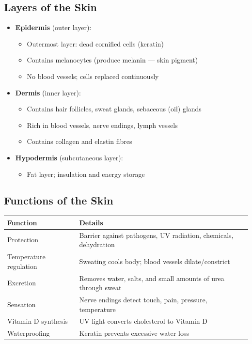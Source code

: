\documentclass[12pt]{article}
\newcommand{\hcell}[1]{\textbf{\color{white}#1}}
\begin{document}
\subsection{Layers of the Skin}
\begin{itemize}[leftmargin=16pt, itemsep=4pt]
  \item \textbf{Epidermis} (outer layer):
    \begin{itemize}[leftmargin=12pt]
      \item Outermost layer: dead cornified cells (keratin)
      \item Contains melanocytes (produce melanin — skin pigment)
      \item No blood vessels; cells replaced continuously
    \end{itemize}
  \item \textbf{Dermis} (inner layer):
    \begin{itemize}[leftmargin=12pt]
      \item Contains hair follicles, sweat glands, sebaceous (oil) glands
      \item Rich in blood vessels, nerve endings, lymph vessels
      \item Contains collagen and elastin fibres
    \end{itemize}
  \item \textbf{Hypodermis} (subcutaneous layer):
    \begin{itemize}[leftmargin=12pt]
      \item Fat layer; insulation and energy storage
    \end{itemize}
\end{itemize}

\subsection{Functions of the Skin}
\begin{center}
\renewcommand{\arraystretch}{1.4}
\begin{tabular}{|C{4cm}|C{8.5cm}|}
\hline
{}\hcell{Function} & \hcell{Details} \\
\hline
Protection & Barrier against pathogens, UV radiation, chemicals, dehydration \\
 Temperature regulation & Sweating cools body; blood vessels dilate/constrict \\
Excretion & Removes water, salts, and small amounts of urea through sweat \\
 Sensation & Nerve endings detect touch, pain, pressure, temperature \\
Vitamin D synthesis & UV light converts cholesterol to Vitamin D \\
 Waterproofing & Keratin prevents excessive water loss \\
\hline
\end{tabular}
\end{center}
\end{document}
